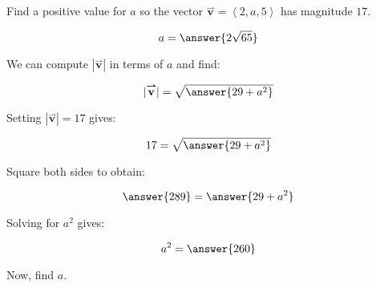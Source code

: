 \documentclass{ximera}
\author{Jim Talamo}
\begin{document}
\begin{exercise}
Find a positive value for $a$ so the vector $\overset{\boldsymbol{\rightharpoonup}}{\mathbf{v}} = \left\langle 2,a,5 \right\rangle$ has magnitude $17$.

\[
a= \answer{2\sqrt{65}}
\]

\begin{hint}
We can compute $|\overset{\boldsymbol{\rightharpoonup}}{\mathbf{v}}|$ in terms of $a$ and find:

\[
|\overset{\boldsymbol{\rightharpoonup}}{\mathbf{v}}| = \sqrt{\answer{29+a^2}}
\]

Setting $|\overset{\boldsymbol{\rightharpoonup}}{\mathbf{v}}| = 17$ gives:

\[
17 = \sqrt{\answer{29+a^2}} \\
\]

Square both sides to obtain:

\[
\answer{289} = \answer{29+a^2}
\]

Solving for $a^2$ gives:

\[
a^2 = \answer{260}
\]

Now, find $a$.
\end{hint}

\end{exercise}
\end{document}
